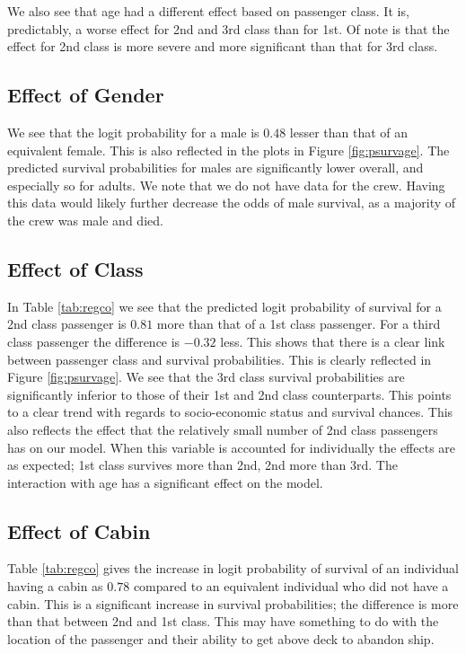 \documentclass[]{extarticle}
\begin{document}
We also see that age had a different effect based on passenger class. It is, predictably, a worse effect for 2nd and 3rd class than for 1st. Of note is that the effect for 2nd class is more severe and more significant than that for 3rd class.

\subsection{Effect of Gender}

We see that the logit probability for a male is $0.48$ lesser than that of an equivalent female. This is also reflected in the plots in Figure \ref{fig:psurvage}. The predicted survival probabilities for males are significantly lower overall, and especially so for adults. We note that we do not have data for the crew. Having this data would likely further decrease the odds of male survival, as a majority of the crew was male and died.

\subsection{Effect of Class}

In Table \ref{tab:regco} we see that the predicted logit probability of survival for a 2nd class passenger is $0.81$ more than that of a 1st class passenger. For a third class passenger the difference is $-0.32$ less. This shows that there is a clear link between passenger class and survival probabilities. This is clearly reflected in Figure \ref{fig:psurvage}. We see that the 3rd class survival probabilities are significantly inferior to those of their 1st and 2nd class counterparts. This points to a clear trend with regards to socio-economic status and survival chances. This also reflects the effect that the relatively small number of 2nd class passengers has on our model. When this variable is accounted for individually the effects are as expected; 1st class survives more than 2nd, 2nd more than 3rd. The interaction with age has a significant effect on the model.

\subsection{Effect of Cabin}

Table \ref{tab:regco} gives the increase in logit probability of survival of an individual having a cabin as $0.78$ compared to an equivalent individual who did not have a cabin. 
This is a significant increase in survival probabilities; the difference is more than that between 2nd and 1st class. This may have something to do with the location of the passenger and their ability to get above deck to abandon ship. 
\end{document}
